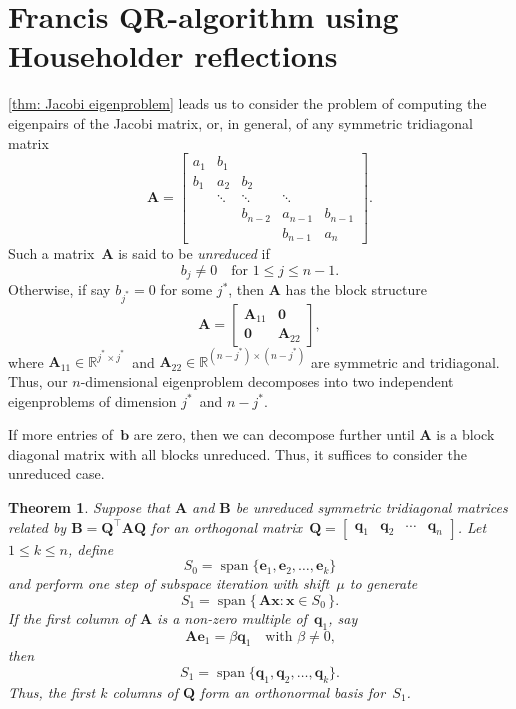\documentclass[12pt,a4paper]{article}
\newtheorem{theorem}{Theorem}
\newcommand{\bs}[1]{\boldsymbol{#1}}
\newcommand{\vecspan}{\operatorname{span}}
\begin{document}
\section{Francis QR-algorithm using Householder reflections}
\cref{thm: Jacobi eigenproblem} leads us to consider the problem of computing 
the eigenpairs of the Jacobi matrix, or, in general, of any symmetric 
tridiagonal matrix
\begin{equation}\label{eq: gen sym trid}
\bs{A}=\begin{bmatrix}
a_1&b_1   &       &       &\\
b_1&a_2   &b_2    &       &\\
   &\ddots&\ddots &\ddots &\\
   &      &b_{n-2}&a_{n-1}&b_{n-1}\\
   &      &       &b_{n-1}&a_n
\end{bmatrix}.
\end{equation}
Such a matrix~$\bs{A}$ is said to be \emph{unreduced} if
\[
b_j\ne0\quad\text{for $1\le j\le n-1$.}
\]
Otherwise, if say $b_{j^*}=0$ for some $j^*$, then $\bs{A}$ has the block 
structure
\[
\bs{A}=\left[\begin{array}{c|c}
\bs{A}_{11}&\bs{0}\\
\hline
\bs{0}&\bs{A}_{22}\end{array}\right],
\]
where $\bs{A}_{11}\in\mathbb{R}^{j^*\times j^*}$~and
$\bs{A}_{22}\in\mathbb{R}^{(n-j^*)\times(n-j^*)}$ are symmetric and tridiagonal.
Thus, our $n$-dimensional eigenproblem decomposes into two independent
eigenproblems of dimension $j^*$~and $n-j^*$.

If more entries of~$\bs{b}$ are zero, then we can decompose further until
$\bs{A}$ is a block diagonal matrix with all blocks unreduced.  Thus, it
suffices to consider the unreduced case.

\begin{theorem}\label{thm: implicit Q}
Suppose that $\bs{A}$ and $\bs{B}$ be unreduced
symmetric tridiagonal matrices related by $\bs{B}=\bs{Q}^\top\bs{A}\bs{Q}$ for
an orthogonal
matrix~$\bs{Q}=\begin{bmatrix}\bs{q}_1&\bs{q}_2&\cdots&\bs{q}_n\end{bmatrix}$.
Let $1\le k\le n$, define
\[
S_0=\vecspan\{\bs{e}_1,\bs{e}_2,\ldots,\bs{e}_k\}
\]
and perform one step of subspace iteration with shift~$\mu$ to generate
\[
S_1=\vecspan\{\,\bs{A}\bs{x}:\bs{x}\in S_0\,\}.
\]
If the first column of $\bs{A}$ is a non-zero multiple of~$\bs{q}_1$,
say
\[
\bs{A}\bs{e}_1=\beta\bs{q}_1\quad\text{with $\beta\ne0$,}
\]
then
\[
S_1=\vecspan\{\bs{q}_1,\bs{q}_2,\ldots,\bs{q}_k\}.
\]
Thus, the first $k$ columns of $\bs{Q}$ form an orthonormal basis for~$S_1$.
\end{theorem}
\end{document}
